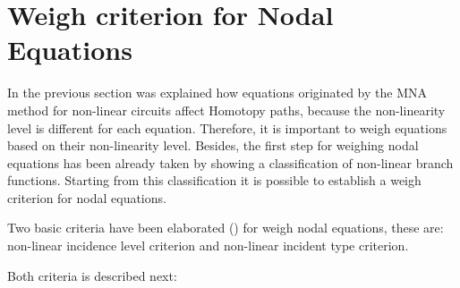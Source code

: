 \documentclass[conference,letterpaper,onecolumn,11pt]{IEEEtran}
\begin{document}
\section{Weigh criterion for Nodal Equations}

In the previous section was explained how equations originated by the MNA method for non-linear circuits affect Homotopy paths, because the non-linearity level is different for each equation. Therefore, it is important to weigh equations based on their non-linearity level. Besides, the first step for weighing nodal equations has been already taken by showing a classification of non-linear branch functions. Starting from this classification it is possible to establish a weigh criterion for nodal equations.

Two basic criteria have been elaborated (\cite{homo_SMACD,homo_ICECS}) for weigh nodal equations, these are: non-linear incidence level criterion and non-linear incident type criterion.

Both criteria is described next:
\end{document}
